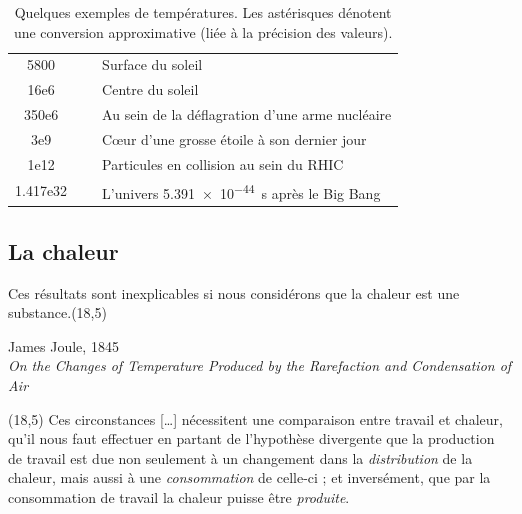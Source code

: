 \begin{table}
\begin{footnotesize}
\begin{spacing}{1}
\begin{innersidebox}
\begin{tabularx}{15.5cm}{@{}S@{}S|p{8.5cm}@{}}
			5800	& ~		& Surface du soleil \\
			16e6	& ~		& Centre du soleil \\
			350e6	& ~		& Au sein de la déflagration d’une arme nucléaire \\
			3e9	& ~		& Cœur d’une grosse étoile à son dernier jour \\
			1e12	& ~		& Particules en collision au sein du RHIC \\
			1.417e32	& ~	& L’univers \SI{5,391e-44}{\second} après le Big Bang \\
			\hline 
		\end{tabularx}
		\end{innersidebox}
		\end{spacing}
		\end{footnotesize}
		\caption{Quelques exemples de températures. Les astérisques dénotent une conversion approximative (liée à la précision des valeurs).}
		\label{tab_temperatures}
		\end{table}
		
		
	\subsection{La chaleur}
	
			Ces résultats sont inexplicables si nous considérons que la chaleur est une substance.\nolinebreak\makebox(18,5){\color{gray}}\par\vspace{-0.3cm}\begin{flushright}James Joule, 1845\\\textit{On the Changes of Temperature Produced by the Rarefaction and Condensation of Air}~\cite{joule1845}\end{flushright}\vspace{-1em}
		\makebox(18,5){\color{gray}}
			Ces circonstances […] nécessitent une comparaison entre travail et chaleur, qu’il nous faut effectuer en partant de l’hypothèse divergente que la production de travail est due non seulement à un changement dans la \emph{distribution} de la chaleur, mais aussi à une \emph{consommation} de celle-ci ; et inversément, que par la consommation de travail la chaleur puisse être \emph{produite}.

